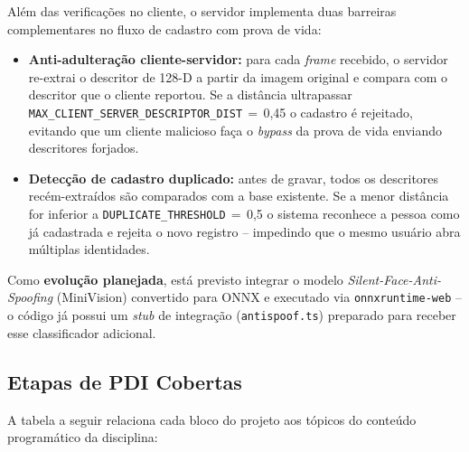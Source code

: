 \documentclass[12pt,a4paper]{article}
\begin{document}
Al\'em das verifica\c{c}\~oes no cliente, o servidor implementa duas barreiras
complementares no fluxo de cadastro com prova de vida:

\begin{itemize}[leftmargin=*]
    \item \textbf{Anti-adultera\c{c}\~ao cliente-servidor:} para cada \emph{frame} recebido,
    o servidor re-extrai o descritor de 128-D a partir da imagem original e
    compara com o descritor que o cliente reportou. Se a dist\^ancia
    ultrapassar \texttt{MAX\_CLIENT\_SERVER\_DESCRIPTOR\_DIST}\,$=$\,0,45 o cadastro \'e
    rejeitado, evitando que um cliente malicioso fa\c{c}a o \emph{bypass} da prova de
    vida enviando descritores forjados.

    \item \textbf{Detec\c{c}\~ao de cadastro duplicado:} antes de gravar, todos os
    descritores rec\'em-extra\'idos s\~ao comparados com a base existente. Se a
    menor dist\^ancia for inferior a \texttt{DUPLICATE\_THRESHOLD}\,$=$\,0,5 o sistema
    reconhece a pessoa como j\'a cadastrada e rejeita o novo registro --
    impedindo que o mesmo usu\'ario abra m\'ultiplas identidades.
\end{itemize}

Como \textbf{evolu\c{c}\~ao planejada}, est\'a previsto integrar o modelo
\emph{Silent-Face-Anti-Spoofing} (MiniVision) convertido para ONNX e executado via
\texttt{onnxruntime-web} -- o c\'odigo j\'a possui um \emph{stub} de integra\c{c}\~ao
(\texttt{antispoof.ts}) preparado para receber esse classificador adicional.

\subsection{Etapas de PDI Cobertas}

A tabela a seguir relaciona cada bloco do projeto aos t\'opicos do conte\'udo program\'atico
da disciplina:
\end{document}
